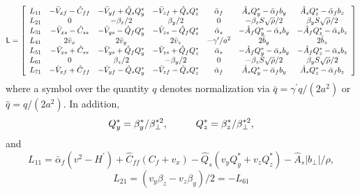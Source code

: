 \begin{equation}
{\sf L} = \left[ \begin{array}{ccccccc}
L_{11} & -\bar{V}_{xf}-\hat{C}_{ff} & -\bar{V}_{yf} + \hat{Q}_{s}Q_{y}^{\ast} & -\bar{V}_{zf} + \hat{Q}_{s}Q_{z}^{\ast} & \bar{\alpha}_{f} & \hat{A}_{s}{Q}_{y}^{\ast} - \bar{\alpha}_{f}b_{y} & \hat{A}_{s}{Q}_{z}^{\ast} - \bar{\alpha}_{f}b_{z} \\
L_{21} & 0 & -\beta_{z}/2 & \beta_{y}/2 & 0 & -\beta_{z}S\sqrt{\rho}/2 & \beta_{y}S\sqrt{\rho}/2 \\
L_{31} & -\bar{V}_{xs}-\hat{C}_{ss} & -\bar{V}_{ys} - \hat{Q}_{f}Q_{y}^{\ast} & -\bar{V}_{zs} - \hat{Q}_{f}Q_{z}^{\ast} & \bar{\alpha}_{s} & -\hat{A}_{f}{Q}_{y}^{\ast} - \bar{\alpha}_{s}b_{y} & -\hat{A}_{f}{Q}_{z}^{\ast} - \bar{\alpha}_{s}b_{z} \\
L_{41} & 2\bar{v}_{x} & 2\bar{v}_{y} & 2\bar{v}_{z} & -\gamma^{\prime}/a^{2} & 2\bar{b}_{y} & 2\bar{b}_{z} \\
L_{51} & -\bar{V}_{xs}+\hat{C}_{ss} & -\bar{V}_{ys} + \hat{Q}_{f}Q_{y}^{\ast} & -\bar{V}_{zs} + \hat{Q}_{f}Q_{z}^{\ast} & \bar{\alpha}_{s} & -\hat{A}_{f}{Q}_{y}^{\ast} - \bar{\alpha}_{s}b_{y} & -\hat{A}_{f}{Q}_{z}^{\ast} - \bar{\alpha}_{s}b_{z} \\
L_{61} & 0 & \beta_{z}/2 & -\beta_{y}/2 & 0 & -\beta_{z}S\sqrt{\rho}/2 & \beta_{y}S\sqrt{\rho}/2 \\
L_{71} & -\bar{V}_{xf}+\hat{C}_{ff} & -\bar{V}_{yf} - \hat{Q}_{s}Q_{y}^{\ast} & -\bar{V}_{zf} - \hat{Q}_{s}Q_{z}^{\ast} & \bar{\alpha}_{f} & \hat{A}_{s}{Q}_{y}^{\ast} - \bar{\alpha}_{f}b_{y} & \hat{A}_{s}{Q}_{z}^{\ast} - \bar{\alpha}_{f}b_{z}
\end{array} \right]
\end{equation}
where a symbol over the quantity $q$ denotes normalization via
$\bar{q} = \gamma^{\prime}q/(2a^{2})$ or $\hat{q} = q/(2a^{2})$.  In addition,
\begin{equation}
Q_{y}^{\ast} = \beta_{y}^{\ast}/\beta_{\perp}^{\ast 2}, \hspace*{1cm}
Q_{z}^{\ast} = \beta_{z}^{\ast}/\beta_{\perp}^{\ast 2},
\end{equation}
and
\begin{equation}
L_{11} = \bar{\alpha}_{f}(v^{2} - H^{\prime}) + \hat{C}_{ff}(C_{f}+v_{x})
- \hat{Q}_{s}(v_{y}Q_{y}^{\ast} + v_{z}Q_{z}^{\ast})
- \hat{A}_{s}|b_{\perp}|/\rho,
\end{equation}
\begin{equation}
L_{21} = (v_{y}\beta_{z} - v_{z}\beta_{y})/2 = -L_{61}
\end{equation}
